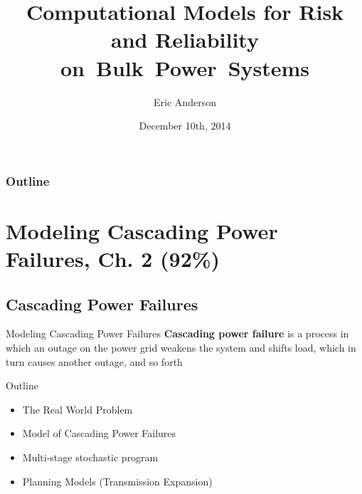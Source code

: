 
\newcommand{\mypathjcc}{../thesis/jcc}
\newcommand{\mypathjccdata}{../thesis/jcc/data}

\title[Cascading Power Failures]{Computational Models for Risk and Reliability on~Bulk~Power~Systems}
\author{Eric Anderson}
\date{December 10th, 2014}



\begin{frame}
\titlepage
\end{frame}



\subsubsection{Outline}


\section{Modeling Cascading Power Failures, Ch. 2 \hfill (92\%)}
\frame{\tableofcontents[currentsection,subsubsectionstyle=hide]}
\subsection{Cascading Power Failures}
\begin{frame}{Modeling Cascading Power Failures}
\textbf{Cascading power failure} is a process in which an outage on the power grid weakens the system and shifts load, which in turn causes another outage, and so forth

\alert{Outline}
\begin{itemize}
\item The Real World Problem
\item Model of Cascading Power Failures
\item Multi-stage stochastic program
\item Planning Models (Transmission Expansion)

\end{itemize}
\end{frame}

